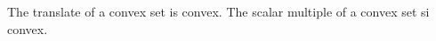 \begin{prop}
  The translate of a convex set is convex.
  The scalar multiple of a convex set si convex.
\end{prop}

%
%
%
%
%
%
%
%
%
%
%
%
\strats
